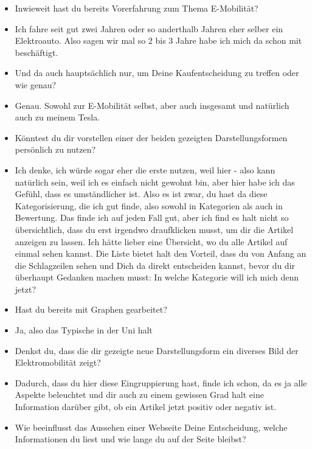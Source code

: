 {\begin{itemize}[]
                  Wenn ich irgendwelchen News erfahre, dann meistens sogar über YouTube.
            \item {} Inwieweit hast du bereits Vorerfahrung zum Thema E-Mobilität?
            \item {} Ich fahre seit gut zwei Jahren oder so anderthalb Jahren eher selber ein Elektroauto.
                  Also sagen wir mal so 2 bis 3 Jahre habe ich mich da schon mit beschäftigt.
            \item {} Und da auch hauptsächlich nur, um Deine Kaufentscheidung zu treffen oder wie genau?
            \item {} Genau.
                  Sowohl zur E-Mobilität selbst, aber auch insgesamt und natürlich auch zu meinem Tesla.
            \item {} Könntest du dir vorstellen einer der beiden gezeigten Darstellungsformen persönlich zu nutzen?
            \item {} Ich denke, ich würde sogar eher die erste nutzen, weil hier - also kann natürlich sein, weil ich es einfach nicht gewohnt bin, aber hier habe ich das Gefühl, dass es umständlicher ist.
                  Also es ist zwar, du hast da diese Kategorisierung, die ich gut finde, also sowohl in Kategorien als auch in Bewertung.
                  Das finde ich auf jeden Fall gut, aber ich find es halt nicht so übersichtlich, dass du erst irgendwo draufklicken musst, um dir die Artikel anzeigen zu lassen.
                  Ich hätte lieber eine Übersicht, wo du alle Artikel auf einmal sehen kannst.
                  Die Liste bietet halt den Vorteil, dass du von Anfang an die Schlagzeilen sehen und Dich da direkt entscheiden kannst, bevor du dir überhaupt Gedanken machen musst: In welche Kategorie will ich mich denn jetzt?
            \item {} Hast du bereits mit Graphen gearbeitet?
            \item {} Ja, also das Typische in der Uni halt
            \item {} Denkst du, dass die dir gezeigte neue Darstellungsform ein diverses Bild der Elektromobilität zeigt?
            \item {} Dadurch, dass du hier diese Eingruppierung hast, finde ich schon, da es ja alle Aspekte beleuchtet und dir auch zu einem gewissen Grad halt eine Information darüber gibt, ob ein Artikel jetzt positiv oder negativ ist.
            \item {} Wie beeinflusst das Aussehen einer Webseite Deine Entscheidung, welche Informationen du liest und wie lange du auf der Seite bleibst?

\end{itemize}}

